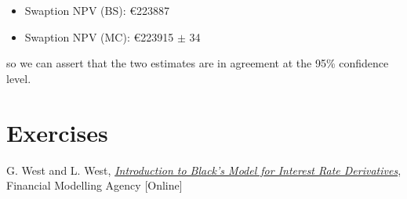 \begin{itemize}
\tightlist
\item
  Swaption NPV (BS): \euro{223887}
\item
  Swaption NPV (MC): \euro{223915} $\pm$ 34
\end{itemize}
so we can assert that the two estimates are in agreement at the 95\% confidence level.

\section{Exercises}


\begin{thebibliography}{9}
 G. West and L. West, \href{http://janroman.dhis.org/finance/Black/IntroToBlack.pdf}{\emph{Introduction to Black's Model for Interest Rate Derivatives}}, Financial Modelling Agency [Online]
\end{thebibliography}